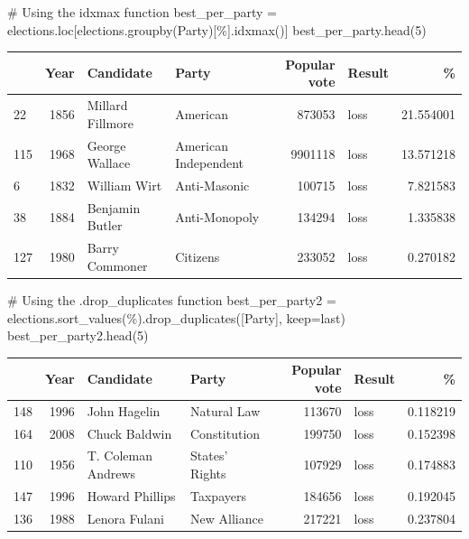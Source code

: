 \documentclass[
  letterpaper,
  DIV=11,
  numbers=noendperiod]{scrreprt}
\newenvironment{Shaded}{\begin{snugshade}}{\end{snugshade}}
\newcommand{\CommentTok}[1]{\textcolor[rgb]{0.37,0.37,0.37}{#1}}
\newcommand{\DecValTok}[1]{\textcolor[rgb]{0.68,0.00,0.00}{#1}}
\newcommand{\NormalTok}[1]{\textcolor[rgb]{0.00,0.23,0.31}{#1}}
\newcommand{\OperatorTok}[1]{\textcolor[rgb]{0.37,0.37,0.37}{#1}}
\newcommand{\StringTok}[1]{\textcolor[rgb]{0.13,0.47,0.30}{#1}}
\begin{document}
\begin{Shaded}
\begin{Highlighting}[]
\CommentTok{\# Using the idxmax function}
\NormalTok{best\_per\_party }\OperatorTok{=}\NormalTok{ elections.loc[elections.groupby(}\StringTok{\textquotesingle{}Party\textquotesingle{}}\NormalTok{)[}\StringTok{\textquotesingle{}\%\textquotesingle{}}\NormalTok{].idxmax()]}
\NormalTok{best\_per\_party.head(}\DecValTok{5}\NormalTok{)}
\end{Highlighting}
\end{Shaded}

\begin{tabular}{lrllrlr}
\toprule
{} &  Year &         Candidate &                 Party &  Popular vote & Result &          \% \\
\midrule
22  &  1856 &  Millard Fillmore &              American &        873053 &   loss &  21.554001 \\
115 &  1968 &    George Wallace &  American Independent &       9901118 &   loss &  13.571218 \\
6   &  1832 &      William Wirt &          Anti-Masonic &        100715 &   loss &   7.821583 \\
38  &  1884 &   Benjamin Butler &         Anti-Monopoly &        134294 &   loss &   1.335838 \\
127 &  1980 &    Barry Commoner &              Citizens &        233052 &   loss &   0.270182 \\
\bottomrule
\end{tabular}

\begin{Shaded}
\begin{Highlighting}[]
\CommentTok{\# Using the .drop\_duplicates function}
\NormalTok{best\_per\_party2 }\OperatorTok{=}\NormalTok{ elections.sort\_values(}\StringTok{\textquotesingle{}\%\textquotesingle{}}\NormalTok{).drop\_duplicates([}\StringTok{\textquotesingle{}Party\textquotesingle{}}\NormalTok{], keep}\OperatorTok{=}\StringTok{\textquotesingle{}last\textquotesingle{}}\NormalTok{)}
\NormalTok{best\_per\_party2.head(}\DecValTok{5}\NormalTok{)}
\end{Highlighting}
\end{Shaded}

\begin{tabular}{lrllrlr}
\toprule
{} &  Year &           Candidate &           Party &  Popular vote & Result &         \% \\
\midrule
148 &  1996 &        John Hagelin &     Natural Law &        113670 &   loss &  0.118219 \\
164 &  2008 &       Chuck Baldwin &    Constitution &        199750 &   loss &  0.152398 \\
110 &  1956 &  T. Coleman Andrews &  States' Rights &        107929 &   loss &  0.174883 \\
147 &  1996 &     Howard Phillips &       Taxpayers &        184656 &   loss &  0.192045 \\
136 &  1988 &       Lenora Fulani &    New Alliance &        217221 &   loss &  0.237804 \\
\bottomrule
\end{tabular}
\end{document}
